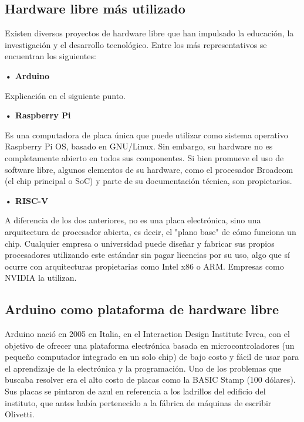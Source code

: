 \documentclass[12pt]{article}
\begin{document}
	\subsection{Hardware libre más utilizado}

    Existen diversos proyectos de hardware libre que han impulsado la educación, la investigación y el desarrollo tecnológico. Entre los más representativos se encuentran los siguientes:

    \smallskip

    \hspace*{\parindent}\textbf{• Arduino}

    Explicación en el siguiente punto.

    \medskip

    \hspace*{\parindent}\textbf{• Raspberry Pi}

    Es una computadora de placa única que puede utilizar como sistema operativo Raspberry Pi OS, basado en GNU/Linux. Sin embargo, su hardware no es completamente abierto en todos sus componentes. Si bien promueve el uso de software libre, algunos elementos de su hardware, como el procesador Broadcom (el chip principal o SoC) y parte de su documentación técnica, son propietarios.

    \medskip

    \hspace*{\parindent}\textbf{• RISC-V}

    A diferencia de los dos anteriores, no es una placa electrónica, sino una arquitectura de procesador abierta, es decir, el "plano base" de cómo funciona un chip. Cualquier empresa o universidad puede diseñar y fabricar sus propios procesadores utilizando este estándar sin pagar licencias por su uso, algo que sí ocurre con arquitecturas propietarias como Intel x86 o ARM. Empresas como NVIDIA la utilizan.
	
	\subsection{Arduino como plataforma de hardware libre}

	Arduino nació en 2005 en Italia, en el Interaction Design Institute Ivrea, con el objetivo de ofrecer una plataforma electrónica basada en microcontroladores (un pequeño computador integrado en un solo chip) de bajo costo y fácil de usar para el aprendizaje de la electrónica y la programación. Uno de los problemas que buscaba resolver era el alto costo de placas como la BASIC Stamp (100 dólares). Sus placas se pintaron de azul en referencia a los ladrillos del edificio del instituto, que antes había pertenecido a la fábrica de máquinas de escribir Olivetti.
	
\end{document}
